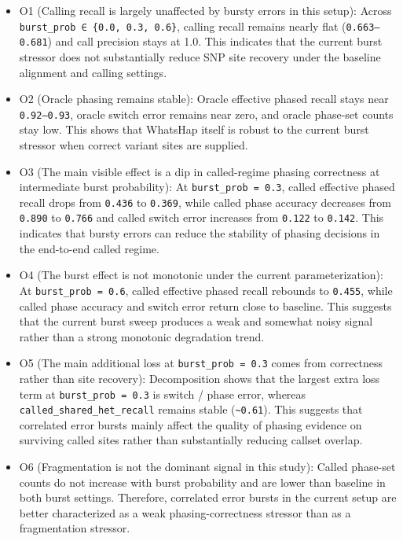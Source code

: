\documentclass[
]{article}
\begin{document}
\begin{itemize}
\item
  O1 (Calling recall is largely unaffected by bursty errors in this
  setup): Across \texttt{burst\_prob\ ∈\ \{0.0,\ 0.3,\ 0.6\}}, calling
  recall remains nearly flat (\texttt{0.663–0.681}) and call precision
  stays at 1.0. This indicates that the current burst stressor does not
  substantially reduce SNP site recovery under the baseline alignment
  and calling settings.
\item
  O2 (Oracle phasing remains stable): Oracle effective phased recall
  stays near \texttt{0.92–0.93}, oracle switch error remains near zero,
  and oracle phase-set counts stay low. This shows that WhatsHap itself
  is robust to the current burst stressor when correct variant sites are
  supplied.
\item
  O3 (The main visible effect is a dip in called-regime phasing
  correctness at intermediate burst probability): At
  \texttt{burst\_prob\ =\ 0.3}, called effective phased recall drops
  from \texttt{0.436} to \texttt{0.369}, while called phase accuracy
  decreases from \texttt{0.890} to \texttt{0.766} and called switch
  error increases from \texttt{0.122} to \texttt{0.142}. This indicates
  that bursty errors can reduce the stability of phasing decisions in
  the end-to-end called regime.
\item
  O4 (The burst effect is not monotonic under the current
  parameterization): At \texttt{burst\_prob\ =\ 0.6}, called effective
  phased recall rebounds to \texttt{0.455}, while called phase accuracy
  and switch error return close to baseline. This suggests that the
  current burst sweep produces a weak and somewhat noisy signal rather
  than a strong monotonic degradation trend.
\item
  O5 (The main additional loss at \texttt{burst\_prob\ =\ 0.3} comes
  from correctness rather than site recovery): Decomposition shows that
  the largest extra loss term at \texttt{burst\_prob\ =\ 0.3} is switch
  / phase error, whereas \texttt{called\_shared\_het\_recall} remains
  stable (\texttt{\textasciitilde{}0.61}). This suggests that correlated
  error bursts mainly affect the quality of phasing evidence on
  surviving called sites rather than substantially reducing callset
  overlap.
\item
  O6 (Fragmentation is not the dominant signal in this study): Called
  phase-set counts do not increase with burst probability and are lower
  than baseline in both burst settings. Therefore, correlated error
  bursts in the current setup are better characterized as a weak
  phasing-correctness stressor than as a fragmentation stressor.
\end{itemize}
\end{document}
